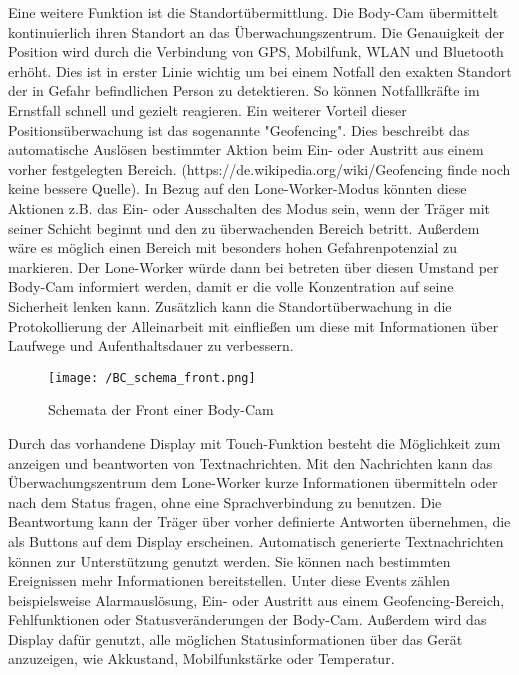 \documentclass[thesis.tex]{subfiles}
\begin{document}
Eine weitere Funktion ist die Standortübermittlung.
Die Body-Cam übermittelt kontinuierlich ihren Standort an das Überwachungszentrum.
Die Genauigkeit der Position wird durch die Verbindung von GPS, Mobilfunk, WLAN und Bluetooth erhöht.
Dies ist in erster Linie wichtig um bei einem Notfall den exakten Standort der in Gefahr befindlichen Person zu detektieren.
So können Notfallkräfte im Ernstfall schnell und gezielt reagieren.
Ein weiterer Vorteil dieser Positionsüberwachung ist das sogenannte "Geofencing".
Dies beschreibt das automatische Auslösen bestimmter Aktion beim Ein- oder Austritt aus einem vorher festgelegten Bereich.
(https://de.wikipedia.org/wiki/Geofencing finde noch keine bessere Quelle).
In Bezug auf den Lone-Worker-Modus könnten diese Aktionen z.B. das Ein- oder Ausschalten des Modus sein, wenn der Träger mit seiner Schicht beginnt und den zu überwachenden Bereich betritt.
Außerdem wäre es möglich einen Bereich mit besonders hohen Gefahrenpotenzial zu markieren.
Der Lone-Worker würde dann bei betreten über diesen Umstand per Body-Cam informiert werden, damit er die volle Konzentration auf seine Sicherheit lenken kann.
Zusätzlich kann die Standortüberwachung in die Protokollierung der Alleinarbeit mit einfließen um diese mit Informationen über Laufwege und Aufenthaltsdauer zu verbessern.

\begin{figure}[h]
    \centering
    \texttt{[image: /BC\_schema\_front.png]}
    \caption{Schemata der Front einer Body-Cam}
    \label{fig:BC_schema}
\end{figure}

Durch das vorhandene Display mit Touch-Funktion besteht die Möglichkeit zum anzeigen und beantworten von Textnachrichten.
Mit den Nachrichten kann das Überwachungszentrum dem Lone-Worker kurze Informationen übermitteln oder nach dem Status fragen, ohne eine Sprachverbindung zu benutzen.
Die Beantwortung kann der Träger über vorher definierte Antworten übernehmen, die als Buttons auf dem Display erscheinen.
Automatisch generierte Textnachrichten können zur Unterstützung genutzt werden.
Sie können nach bestimmten Ereignissen mehr Informationen bereitstellen.
Unter diese Events zählen beispielsweise Alarmauslösung, Ein- oder Austritt aus einem Geofencing-Bereich, Fehlfunktionen oder Statusveränderungen der Body-Cam.
Außerdem wird das Display dafür genutzt, alle möglichen Statusinformationen über das Gerät anzuzeigen, wie Akkustand, Mobilfunkstärke oder Temperatur.
\end{document}

